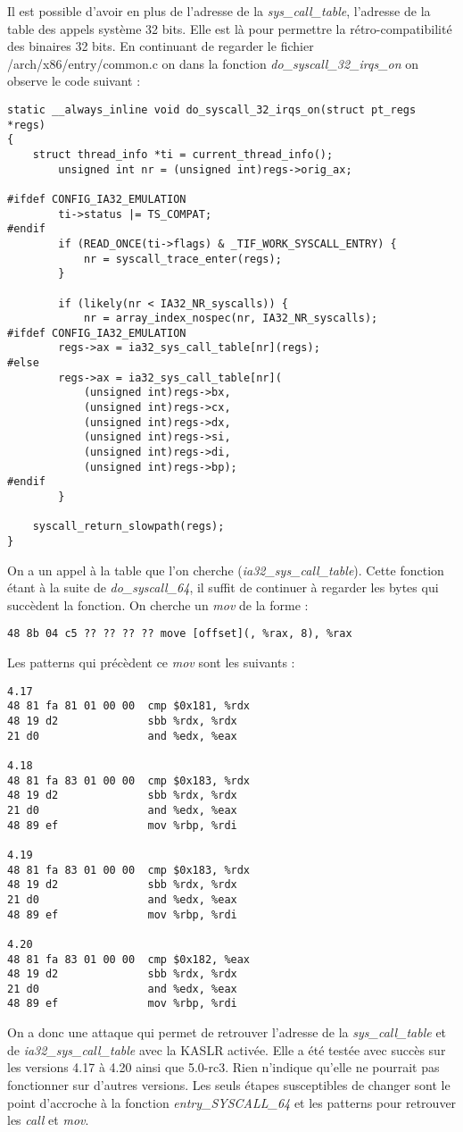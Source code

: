 \documentclass[journal, a4paper]{IEEEtran}
\begin{document}
Il est possible d'avoir en plus de l'adresse de la \textit{sys\_call\_table}, l'adresse de la table des appels système 32 bits. Elle est là pour permettre la rétro-compatibilité des binaires 32 bits. En continuant de regarder le fichier /arch/x86/entry/common.c on dans la fonction \textit{do\_syscall\_32\_irqs\_on} on observe le code suivant :
\begin{lstlisting}[style=CStyle]
static __always_inline void do_syscall_32_irqs_on(struct pt_regs *regs)
{
	struct thread_info *ti = current_thread_info();
		unsigned int nr = (unsigned int)regs->orig_ax;

#ifdef CONFIG_IA32_EMULATION
		ti->status |= TS_COMPAT;
#endif
		if (READ_ONCE(ti->flags) & _TIF_WORK_SYSCALL_ENTRY) {
			nr = syscall_trace_enter(regs);
		}

		if (likely(nr < IA32_NR_syscalls)) {
			nr = array_index_nospec(nr, IA32_NR_syscalls);
#ifdef CONFIG_IA32_EMULATION
		regs->ax = ia32_sys_call_table[nr](regs);
#else
		regs->ax = ia32_sys_call_table[nr](
			(unsigned int)regs->bx,
			(unsigned int)regs->cx,
			(unsigned int)regs->dx,
			(unsigned int)regs->si,
			(unsigned int)regs->di,
			(unsigned int)regs->bp);
#endif
		}

	syscall_return_slowpath(regs);
}
\end{lstlisting}
On a un appel à la table que l'on cherche (\textit{ia32\_sys\_call\_table}).
Cette fonction étant à la suite de \textit{do\_syscall\_64}, il suffit de continuer à regarder les bytes qui succèdent la fonction. On cherche un \textit{mov} de la forme :
\begin{lstlisting}[style=CStyle]
48 8b 04 c5 ?? ?? ?? ?? move [offset](, %rax, 8), %rax
\end{lstlisting}
Les patterns qui précèdent ce \textit{mov} sont les suivants :
\begin{lstlisting}[style=CStyle]
4.17  
48 81 fa 81 01 00 00  cmp $0x181, %rdx  
48 19 d2              sbb %rdx, %rdx  
21 d0                 and %edx, %eax  

4.18  
48 81 fa 83 01 00 00  cmp $0x183, %rdx  
48 19 d2              sbb %rdx, %rdx  
21 d0                 and %edx, %eax  
48 89 ef              mov %rbp, %rdi  

4.19  
48 81 fa 83 01 00 00  cmp $0x183, %rdx  
48 19 d2              sbb %rdx, %rdx  
21 d0                 and %edx, %eax  
48 89 ef              mov %rbp, %rdi  

4.20  
48 81 fa 83 01 00 00  cmp $0x182, %eax  
48 19 d2              sbb %rdx, %rdx  
21 d0                 and %edx, %eax  
48 89 ef              mov %rbp, %rdi  
\end{lstlisting}
On a donc une attaque qui permet de retrouver l'adresse de la \textit{sys\_call\_table} et de \textit{ia32\_sys\_call\_table} avec la KASLR activée. Elle a été testée avec succès sur les versions 4.17 à 4.20 ainsi que 5.0-rc3. Rien n'indique qu'elle ne pourrait pas fonctionner sur d'autres versions. Les seuls étapes susceptibles de changer sont le point d'accroche à la fonction \textit{entry\_SYSCALL\_64} et les patterns pour retrouver les \textit{call} et \textit{mov}.
\end{document}
